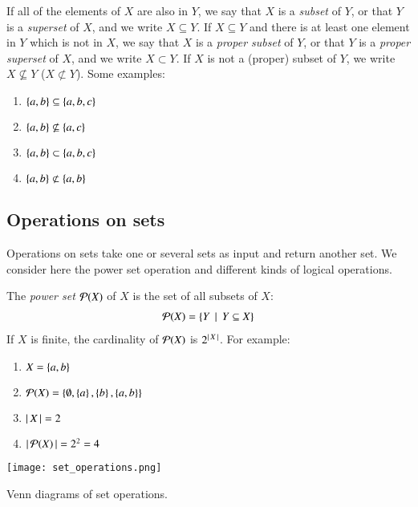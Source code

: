 \documentclass[nobib,nofonts]{tufte-handout}
\begin{document}
If all of the elements of $X$ are also in $Y$, we say that $X$ is a \emph{subset} of $Y$, or
that $Y$ is a \emph{superset} of $X$, and we write $X \subseteq Y$. If $X \subseteq Y$ and
there is at least one element in $Y$ which is not in $X$, we say that $X$ is a \emph{proper
  subset} of $Y$, or that $Y$ is a \emph{proper superset} of $X$, and we write $X \subset
Y$.
If $X$ is not a (proper) subset of $Y$, we write $X \not \subseteq Y$ ($X \not \subset
Y$). Some examples:
\begin{multicols}{2}
  \begin{enumerate}[]
  \item $\left\{a,b\right\} \subseteq \left\{a,b,c\right\}$
  \item $\left\{a,b\right\} \not \subseteq \left\{a,c\right\}$
  \item $\left\{a,b\right\} \subset \left\{a,b,c\right\}$
  \item $\left\{a,b\right\} \not \subset \left\{a,b\right\}$
  \end{enumerate}
\end{multicols}

\subsection{Operations on sets}

Operations on sets take one or several sets as input and return another set.
We consider here the power set operation and different kinds of logical operations.

The \emph{power set} $\mathcal{P}(X)$ of $X$ is the set of all subsets of $X$:
\begin{align*}
  \mathcal{P}(X) = \left\{Y \thinspace \mid \thinspace Y \subseteq X\right\}
\end{align*}
If $X$ is finite, the cardinality of $\mathcal{P}(X)$ is $2^{\left \lvert \, X \, \right\rvert}$. For example:
\begin{multicols}{2}
  \begin{enumerate}[]
  \item $X = \left\{a,b\right\}$
  \item $\mathcal{P}(X) = \left\{\emptyset, \left\{a\right\}, \left\{b\right\}, \left\{a,b\right\}\right\}$
  \item $\left \lvert \, X \, \right\rvert = 2$
  \item $\left \lvert \, \mathcal{P}(X) \, \right\rvert = 2^2 = 4$
  \end{enumerate}
\end{multicols}


\begin{marginfigure}[2cm]
  \texttt{[image: set\_operations.png]}
  \caption{Venn diagrams of set operations.}
\end{marginfigure}
\end{document}
